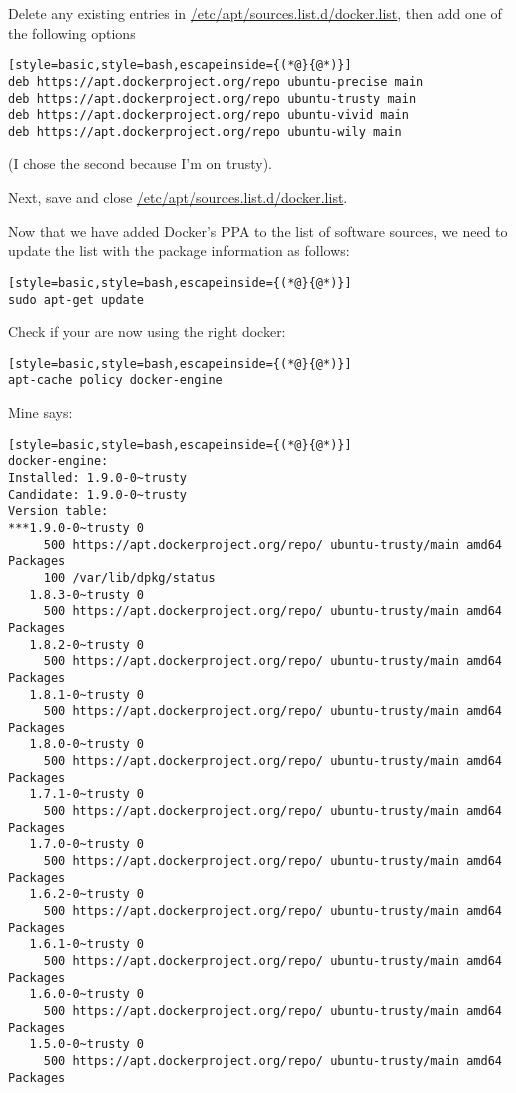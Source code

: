 Delete any existing entries in \url{/etc/apt/sources.list.d/docker.list}, then add one of the following options
\begin{lstlisting}[style=basic,style=bash,escapeinside={(*@}{@*)}]
deb https://apt.dockerproject.org/repo ubuntu-precise main
deb https://apt.dockerproject.org/repo ubuntu-trusty main
deb https://apt.dockerproject.org/repo ubuntu-vivid main
deb https://apt.dockerproject.org/repo ubuntu-wily main
\end{lstlisting}
(I chose the second because I'm on trusty).

Next, save and close \url{/etc/apt/sources.list.d/docker.list}.

Now that we have added Docker's PPA to the list of software sources, we need to update the list with the package information as follows:
\begin{lstlisting}[style=basic,style=bash,escapeinside={(*@}{@*)}]
sudo apt-get update
\end{lstlisting}

Check if your are now using the right docker:
\begin{lstlisting}[style=basic,style=bash,escapeinside={(*@}{@*)}]
apt-cache policy docker-engine
\end{lstlisting}
Mine says:
\begin{lstlisting}[style=basic,style=bash,escapeinside={(*@}{@*)}]
docker-engine:
Installed: 1.9.0-0~trusty
Candidate: 1.9.0-0~trusty
Version table:
***1.9.0-0~trusty 0
     500 https://apt.dockerproject.org/repo/ ubuntu-trusty/main amd64 Packages
     100 /var/lib/dpkg/status
   1.8.3-0~trusty 0
     500 https://apt.dockerproject.org/repo/ ubuntu-trusty/main amd64 Packages
   1.8.2-0~trusty 0
     500 https://apt.dockerproject.org/repo/ ubuntu-trusty/main amd64 Packages
   1.8.1-0~trusty 0
     500 https://apt.dockerproject.org/repo/ ubuntu-trusty/main amd64 Packages
   1.8.0-0~trusty 0
     500 https://apt.dockerproject.org/repo/ ubuntu-trusty/main amd64 Packages
   1.7.1-0~trusty 0
     500 https://apt.dockerproject.org/repo/ ubuntu-trusty/main amd64 Packages
   1.7.0-0~trusty 0
     500 https://apt.dockerproject.org/repo/ ubuntu-trusty/main amd64 Packages
   1.6.2-0~trusty 0
     500 https://apt.dockerproject.org/repo/ ubuntu-trusty/main amd64 Packages
   1.6.1-0~trusty 0
     500 https://apt.dockerproject.org/repo/ ubuntu-trusty/main amd64 Packages
   1.6.0-0~trusty 0
     500 https://apt.dockerproject.org/repo/ ubuntu-trusty/main amd64 Packages
   1.5.0-0~trusty 0
     500 https://apt.dockerproject.org/repo/ ubuntu-trusty/main amd64 Packages
\end{lstlisting}


